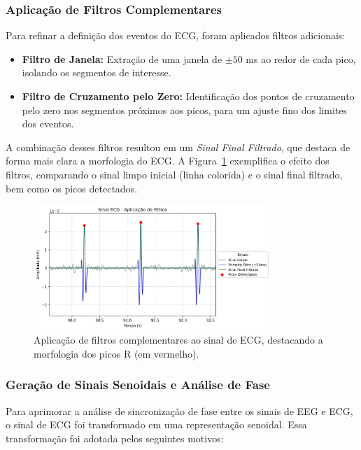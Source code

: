 \subsubsection{Aplicação de Filtros Complementares}

Para refinar a definição dos eventos do ECG, foram aplicados filtros adicionais:
\begin{itemize}
    \item \textbf{Filtro de Janela:} Extração de uma janela de \(\pm50\) ms ao redor de cada pico, isolando os segmentos de interesse.
    \item \textbf{Filtro de Cruzamento pelo Zero:} Identificação dos pontos de cruzamento pelo zero nos segmentos próximos aos picos, para um ajuste fino dos limites dos eventos.
\end{itemize}
A combinação desses filtros resultou em um \emph{Sinal Final Filtrado}, que destaca de forma mais clara a morfologia do ECG. A Figura~\ref{fig:ecg_filtros_aplicados} exemplifica o efeito dos filtros, comparando o sinal limpo inicial (linha colorida) e o sinal final filtrado, bem como os picos detectados.

\begin{figure}[htb]
    \centering
    \includegraphics[width=0.8\textwidth]{figs/2_preprocessamento_ecg/2_Sinal_ECG_-_Aplicação_de_Filtros_zoom.png}
    \caption{Aplicação de filtros complementares ao sinal de ECG, destacando a morfologia dos picos R (em vermelho).}
    \label{fig:ecg_filtros_aplicados}
\end{figure}

\subsubsection{Geração de Sinais Senoidais e Análise de Fase}

Para aprimorar a análise de sincronização de fase entre os sinais de EEG e ECG, o sinal de ECG foi transformado em uma representação senoidal. Essa transformação foi adotada pelos seguintes motivos:

